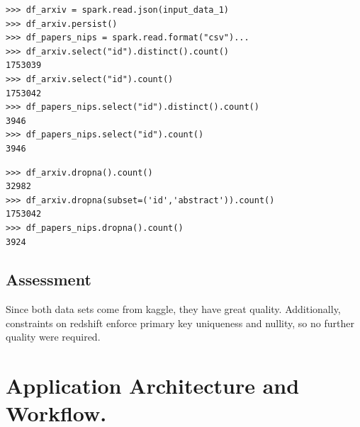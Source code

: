 \begin{mdframed}[backgroundcolor=light-gray, roundcorner=10pt,leftmargin=1, rightmargin=1, innerleftmargin=15, innertopmargin=15,innerbottommargin=15, outerlinewidth=1, linecolor=light-gray]
\begin{lstlisting}[caption={Volume and Uniqueness},label={vol}]  
>>> df_arxiv = spark.read.json(input_data_1)
>>> df_arxiv.persist()
>>> df_papers_nips = spark.read.format("csv")...
>>> df_arxiv.select("id").distinct().count()
1753039                                                                         
>>> df_arxiv.select("id").count()
1753042                                                                         
>>> df_papers_nips.select("id").distinct().count()
3946
>>> df_papers_nips.select("id").count()
3946
\end{lstlisting}
\end{mdframed} 

\begin{mdframed}[backgroundcolor=light-gray, roundcorner=10pt,leftmargin=1, rightmargin=1, innerleftmargin=15, innertopmargin=15,innerbottommargin=15, outerlinewidth=1, linecolor=light-gray]
\begin{lstlisting}[caption={Completeness of the Datastsets},label={completeness}]  
>>> df_arxiv.dropna().count()
32982                                                                           
>>> df_arxiv.dropna(subset=('id','abstract')).count()
1753042                                                                         
>>> df_papers_nips.dropna().count()
3924
\end{lstlisting}
\end{mdframed} 

\subsection{Assessment}
Since both data sets come from kaggle, they have great quality. Additionally, constraints on redshift enforce primary key uniqueness and nullity, so
no further quality were required.

\section{Application Architecture and Workflow.}











